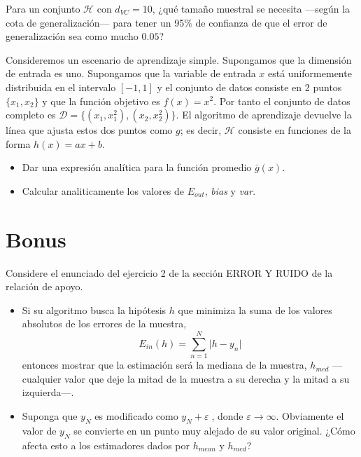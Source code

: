 \documentclass[a4paper, 11pt]{article}
\begin{document}
    \begin{ejercicio}
        Para un conjunto $\mathcal{H}$ con $d_{VC} = 10$, ¿qué tamaño muestral se necesita ---según la cota de generalización--- para tener un 95\% de confianza de que el error de generalización sea como mucho $0.05$?
    \end{ejercicio}

    \begin{ejercicio}
        Consideremos un escenario de aprendizaje simple. Supongamos que la dimensión de entrada es uno. Supongamos que la variable de entrada $x$ está uniformemente distribuida en el intervalo $[-1, 1]$ y el conjunto de datos consiste en 2 puntos $\{x_1, x_2\}$ y que la función objetivo es $f(x) = x^2$. Por tanto el conjunto de datos completo es $\mathcal{D} = \{(x_1 , x_1^2), (x_2, x_2^2)\}$. El algoritmo de aprendizaje devuelve la línea que ajusta estos dos puntos como $g$; es decir, $\mathcal{H}$ consiste en funciones de la forma $h(x) = ax + b$.
        \begin{itemize}
            \item Dar una expresión analítica para la función promedio $\bar{g}(x)$.
            \item Calcular analiticamente los valores de $E_{out}$, \emph{bias} y \emph{var}.
        \end{itemize}
    \end{ejercicio}


    \section{Bonus}

    \begin{bonus}
        Considere el enunciado del ejercicio 2 de la sección ERROR Y RUIDO de la relación de apoyo.
        \begin{itemize}
            \item Si su algoritmo busca la hipótesis $h$ que minimiza la suma de los valores absolutos de los errores de la muestra,
            \[
            E_{in}(h) = \sum_{n=1}^N \vert h - y_n \vert
            \]
            entonces mostrar que la estimación será la mediana de la muestra, $h_{med}$ ---cualquier valor que deje la mitad de la muestra a su derecha y la mitad a su izquierda---.
            \item Suponga que $y_N$ es modificado como $y_N + \varepsilon$, donde $\varepsilon \to \infty$. Obviamente el valor de $y_N$ se convierte en un punto muy alejado de su valor original. ¿Cómo afecta esto a los estimadores dados por $h_{mean}$ y $h_{med}$?
        \end{itemize}
    \end{bonus}
\end{document}
